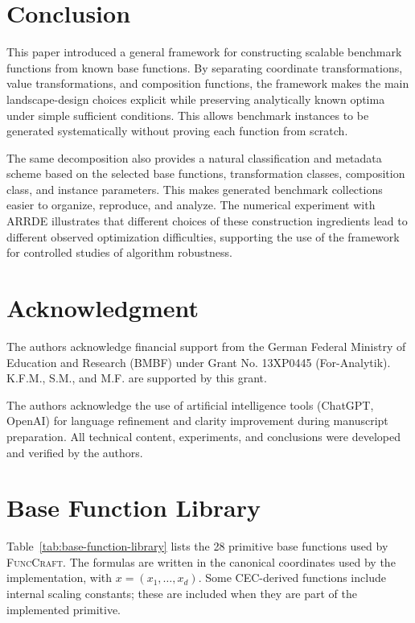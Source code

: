 \documentclass[journal]{IEEEtran}
\theoremstyle{remark}
\theoremstyle{plain}
\begin{document}
\section{Conclusion}

This paper introduced a general framework for constructing scalable benchmark
functions from known base functions. By separating coordinate transformations,
value transformations, and composition functions, the framework makes the main
landscape-design choices explicit while preserving analytically known optima
under simple sufficient conditions. This allows benchmark instances to be
generated systematically without proving each function from scratch.

The same decomposition also provides a natural classification and metadata
scheme based on the selected base functions, transformation classes,
composition class, and instance parameters. This makes generated benchmark
collections easier to organize, reproduce, and analyze. The numerical
experiment with ARRDE illustrates that different choices of these construction
ingredients lead to different observed optimization difficulties, supporting
the use of the framework for controlled studies of algorithm robustness.




\section*{Acknowledgment}
The authors acknowledge financial support from the German
Federal Ministry of Education and Research (BMBF) under
Grant No. 13XP0445 (For-Analytik). K.F.M., S.M., and M.F.
are supported by this grant.


The authors acknowledge the use of artificial intelligence
tools (ChatGPT, OpenAI) for language refinement and clarity
improvement during manuscript preparation. All technical
content, experiments, and conclusions were developed and
verified by the authors.


\twocolumn





\onecolumn
\appendices

\section{Base Function Library}
\label{app:base-functions}

Table~\ref{tab:base-function-library} lists the 28 primitive base functions used
by \textsc{FuncCraft}. The formulas are written in the canonical coordinates
used by the implementation, with \(x=(x_1,\ldots,x_d)\). Some CEC-derived
functions include internal scaling constants; these are included when they are
part of the implemented primitive.
\end{document}
